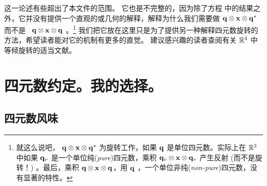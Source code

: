 这一论述有些超出了本文件的范围。 
它也是不完整的，因为除了方程  中的结果之外，它并没有提供一个直观的或几何的解释，解释为什么我们需要做 ${\bf q}\otimes{\bf x}\otimes{\bf q}^*$ 而不是 \eg~${\bf q}\otimes{\bf x}\otimes{\bf q}$ 。\footnote{就这么说吧， ${\bf q}\otimes{\bf x}\otimes{\bf q}^*$ 为旋转工作，如果 ${\bf q}$ 是单位四元数。实际上在 ${\mathbb R}^3$ 中如果 ${\bf q}_v$ 是一个单位纯(\emph{pure})四元数，乘积 ${\bf q}_v\otimes{\bf x}\otimes{\bf q}_v$ 产生反射 (而不是旋转！) 。最后，乘积 ${\bf q}\otimes{\bf x}\otimes{\bf q}$，用 ${\bf q}$ ，一个单位非纯(\emph{non-pure})四元数，没有显著的特性。}
我们把它放在这里只是为了提供另一种解释四元数旋转的方法，希望读者能对它的机制有更多的直觉。
建议感兴趣的读者查阅有关 ${\mathbb R}^4$ 中等倾旋转的适当文献。






\section{四元数约定。我的选择。}
\label{sec:conventions}

\subsection{四元数风味}


